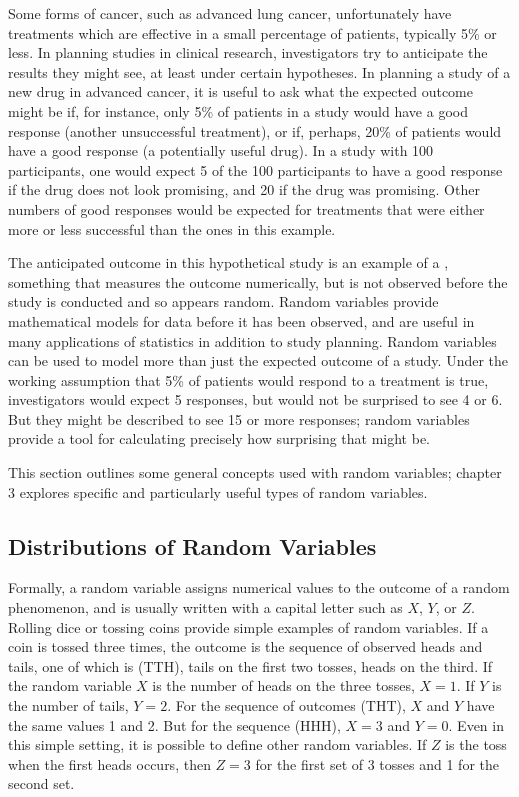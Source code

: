 \begin{doublespace}
Some forms of cancer, such as advanced lung cancer, unfortunately have treatments which are effective in a small percentage of patients, typically 5\% or less. In planning studies in clinical research, investigators try to anticipate the results they might see, at least under certain hypotheses. In planning a study of a new drug in advanced cancer, it is useful to ask what the expected outcome might be if, for instance, only 5\% of patients in a study would have a good response (another unsuccessful treatment), or if, perhaps, 20\% of patients would have a good response (a potentially useful drug). In a study with 100 participants, one would expect 5 of the 100 participants to have a good response if the drug does not look promising, and 20 if the drug was promising. Other numbers of good responses would be expected for treatments that were either more or less successful than the ones in this example.

The anticipated outcome in this hypothetical study is an example of a , something that measures the outcome numerically, but is not observed before the study is conducted and so appears random. Random variables provide mathematical models for data before it has been observed, and are useful in many applications of statistics in addition to study planning. Random variables can be used to model more than just the expected outcome of a study. Under the working assumption that 5\% of patients would respond to a treatment is true, investigators would expect 5 responses, but would not be surprised to see 4 or 6. But they might be described to see 15 or more responses; random variables provide a tool for calculating precisely how surprising that might be.

This section outlines some general concepts used with random variables; chapter 3 explores specific and particularly useful types of random variables.

\subsection{Distributions of Random Variables}

Formally, a random variable assigns numerical values to the outcome of a random phenomenon, and is usually written with a capital letter such as $X$, $Y$, or $Z$.  Rolling dice or tossing coins provide simple examples of random variables.  If a coin is tossed three times, the outcome is the sequence of observed heads and tails, one of which is (TTH), tails on the first two tosses, heads on the third.  If the random variable $X$ is the number of heads on the three tosses, $X = 1$. If $Y$ is the number of tails, $Y = 2$.  For the sequence of outcomes (THT), $X$ and $Y$ have the same values 1 and 2. But for the sequence (HHH), $X = 3$ and $Y = 0$.  Even in this simple setting, it is possible to define other random variables.  If $Z$ is the toss when the first heads occurs, then $Z=3$ for the first set of 3 tosses and 1 for the second set.







\end{doublespace}
